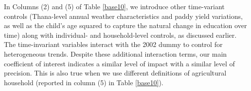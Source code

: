 \documentclass[12pt,letterpaper]{article}
\newcommand{\SAdded}[1]{\textcolor{red}{#1}}
\newcommand{\0}{\ensuremath{\mbox{\boldmath $0$}}}
\begin{document}


In Columns (2) and (5) of Table \ref{base10}, we introduce other time-variant controls (Thana-level annual weather characteristics and paddy yield variations, as well as the child's age squared to capture the natural change in education over time) along with individual- and household-level controls, as discussed earlier. The time-invariant variables interact with the 2002 dummy to control for heterogeneous trends. Despite these additional interaction terms, our main coefficient of interest indicates a similar level of impact with a similar level of precision. This is also true when we use different definitions of agricultural household (reported in column (5) in Table \ref{base10}).


\end{document}
